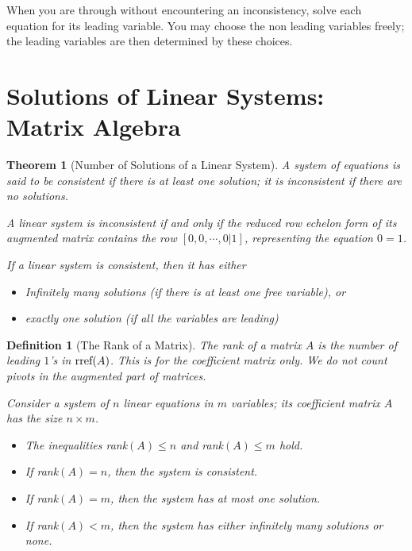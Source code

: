 \documentclass[10pt]{report}
\newtheorem{thm2}{Theorem}[section]
\newtheorem{def2}{Definition}[section]
\newcommand{\rref}{\textup{rref}}
\begin{document}
When you are through without encountering an inconsistency, solve each equation for its leading variable. You may choose the non leading variables freely; the leading variables are then determined by these choices.
\section{Solutions of Linear Systems: Matrix Algebra}
\begin{thm2}[Number of Solutions of a Linear System]
A system of equations is said to be \textit{consistent} if there is at least one solution; it is \textit{inconsistent} if there are no solutions.

A linear system is inconsistent if and only if the reduced row echelon form of its augmented matrix contains the row $[0,  0,  \cdots, 0 | 1 ]$, representing the equation $0=1$.

If a linear system is consistent, then it has either
\begin{itemize}
\item[1.] \textit{Infinitely many solutions} (if there is at least one free variable), or
\item[2.] \textit{exactly one solution} (if all the variables are leading)
\end{itemize}
\end{thm2}
\begin{def2}[The Rank of a Matrix]
The rank of a matrix $A$ is the number of leading $1$'s in $\rref(A)$.
This is for the coefficient matrix only. We do not count pivots in the augmented part of matrices.

Consider a system of $n$ linear equations in $m$ variables; its coefficient matrix $A$ has the size $n\times m$.
\begin{itemize}
\item[1.] The inequalities rank$(A)\leq n$ and rank$(A)\leq m$ hold.
\item[2.] If rank$(A)=n$, then the system is consistent.
\item[3.] If rank$(A)=m$, then the system has at most one solution.
\item[4.] If rank$(A)< m$, then the system has either infinitely many solutions or none.
\end{itemize}
\end{def2}
\end{document}
